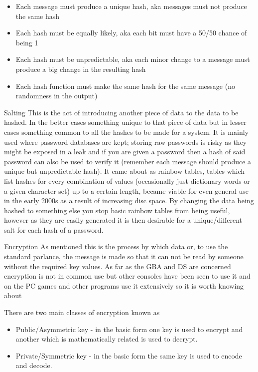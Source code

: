 \documentclass[
]{book}
\providecommand{\tightlist}{%
  \setlength{\itemsep}{0pt}\setlength{\parskip}{0pt}}
\begin{document}
\begin{itemize}
\tightlist
\item
  Each message must produce a unique hash, aka messages must not produce the same hash
\item
  Each hash must be equally likely, aka each bit must have a 50/50 chance of being 1
\item
  Each hash must be unpredictable, aka each minor change to a message must produce a big change in the resulting hash
\item
  Each hash function must make the same hash for the same message (no randomness in the output)
\end{itemize}

Salting This is the act of introducing another piece of data to the data to be hashed. In the better cases something unique to that piece of data but in lesser cases something common to all the hashes to be made for a system. It is mainly used where password databases are kept; storing raw passwords is risky as they might be exposed in a leak and if you are given a password then a hash of said password can also be used to verify it (remember each message should produce a unique but unpredictable hash). It came about as rainbow tables, tables which list hashes for every combination of values (occasionally just dictionary words or a given character set) up to a certain length, became viable for even general use in the early 2000s as a result of increasing disc space. By changing the data being hashed to something else you stop basic rainbow tables from being useful, however as they are easily generated it is then desirable for a unique/different salt for each hash of a password.

Encryption As mentioned this is the process by which data or, to use the standard parlance, the message is made so that it can not be read by someone without the required key values. As far as the GBA and DS are concerned encryption is not in common use but other consoles have been seen to use it and on the PC games and other programs use it extensively so it is worth knowing about

There are two main classes of encryption known as

\begin{itemize}
\tightlist
\item
  Public/Asymmetric key - in the basic form one key is used to encrypt and another which is mathematically related is used to decrypt.
\item
  Private/Symmetric key - in the basic form the same key is used to encode and decode.
\end{itemize}
\end{document}
